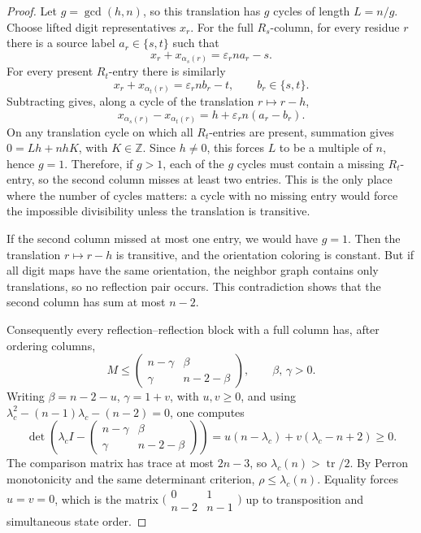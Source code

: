 \documentclass{amsart}
\theoremstyle{definition}
\theoremstyle{remark}
\newcommand{\Z}{\mathbb{Z}}
\begin{document}
\begin{proof}
Let \(g=\gcd(h,n)\), so this translation has \(g\) cycles of length
\(L=n/g\).  Choose lifted digit representatives \(x_r\).  For the full
\(R_s\)-column, for every residue \(r\) there is a source label
\(a_r\in\{s,t\}\) such that
\[
  x_r+x_{\alpha_s(r)}=\varepsilon_r n a_r-s.
\]
For every present \(R_t\)-entry there is similarly
\[
  x_r+x_{\alpha_t(r)}=\varepsilon_r n b_r-t,
  \qquad b_r\in\{s,t\}.
\]
Subtracting gives, along a cycle of the translation \(r\mapsto r-h\),
\[
  x_{\alpha_s(r)}-x_{\alpha_t(r)}
  =h+\varepsilon_r n(a_r-b_r).
\]
On any translation cycle on which all \(R_t\)-entries are present,
summation gives \(0=Lh+nhK\), with \(K\in\Z\).  Since \(h\ne0\), this
forces \(L\) to be a multiple of \(n\), hence \(g=1\).  Therefore, if
\(g>1\), each of the \(g\) cycles must contain a missing \(R_t\)-entry,
so the second column misses at least two entries.
This is the only place where the number of cycles matters: a cycle with
no missing entry would force the impossible divisibility unless the
translation is transitive.

If the second column missed at most one entry, we would have \(g=1\).
Then the translation \(r\mapsto r-h\) is transitive, and the orientation
coloring is constant.  But if all digit maps have the same orientation,
the neighbor graph contains only translations, so no reflection pair
occurs.  This contradiction shows that the second column has
sum at most \(n-2\).

Consequently every reflection--reflection block with a full column has,
after ordering columns,
\[
  M\le
  \begin{pmatrix}n-\gamma&\beta\\
                  \gamma&n-2-\beta\end{pmatrix},
  \qquad \beta,\,\gamma>0.
\]
Writing \(\beta=n-2-u\), \(\gamma=1+v\), with \(u,v\ge0\), and using
\(\lambda_c^2-(n-1)\lambda_c-(n-2)=0\), one computes
\[
  \det\!\left(\lambda_c I-
  \begin{pmatrix}n-\gamma&\beta\\
                  \gamma&n-2-\beta\end{pmatrix}\right)
  =u(n-\lambda_c)+v(\lambda_c-n+2)\ge0.
\]
The comparison matrix has trace at most \(2n-3\), so
\(\lambda_c(n)>\operatorname{tr}/2\).  By Perron monotonicity and the
same determinant criterion, \(\rho\le\lambda_c(n)\).  Equality forces
\(u=v=0\), which is the
matrix \(\bigl(\begin{smallmatrix}0&1\\ n-2&n-1\end{smallmatrix}\bigr)\)
up to transposition and simultaneous state order.


\end{proof}
\end{document}
